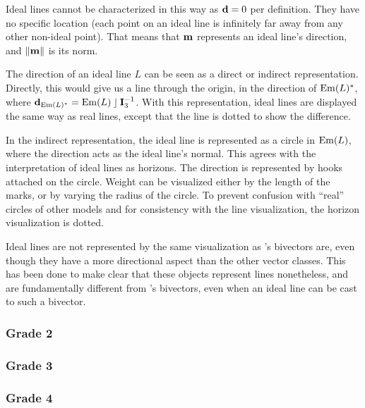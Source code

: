 Ideal lines cannot be characterized in this way as $\mathbf{d} = 0$ per definition.  They have no specific location (each point on an ideal line is infinitely far away from any other non-ideal point).  That means that $\mathbf{m}$ represents an ideal line's direction, and $\left\|\mathbf{m}\right\|$ is its norm.

The direction of an ideal line $L$ can be seen as a direct or indirect representation.  Directly, this would give us a line through the origin, in the direction of $\operatorname{Em}(L)^\ast$, where $\mathbf{d}_{\operatorname{Em}(L)^\ast} = \operatorname{Em}(L) \mathbin{\rfloor} \mathbf{I}_3^{-1}$.  With this representation, ideal lines are displayed the same way as real lines, except that the line is dotted to show the difference. 

In the indirect representation, the ideal line is represented as a circle in $\operatorname{Em}(L)$, where the direction acts as the ideal line's normal.  This agrees with the interpretation of ideal lines as horizons.  The direction is represented by hooks attached on the circle.  Weight can be visualized either by the length of the marks, or by varying the radius of the circle.  To prevent confusion with ``real'' circles of other models and for consistency with the line visualization, the horizon visualization is dotted.

Ideal lines are not represented by the same visualization as \ega's bivectors are, even though they have a more directional aspect than the other vector classes.  This has been done to make clear that these objects represent lines nonetheless, and are fundamentally different from \ega's bivectors, even when an ideal line can be cast to such a bivector.



\subsubsection{Grade 2}


\subsubsection{Grade 3}



\subsubsection{Grade 4}

